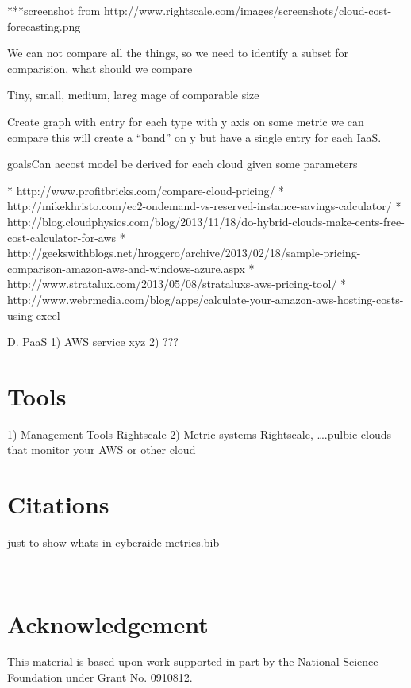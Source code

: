 \documentclass{sig-alternate}
\begin{document}
***screenshot from http://www.rightscale.com/images/screenshots/cloud-cost-forecasting.png

We can not compare all the things, so we need to identify a subset for comparision, what should we compare

Tiny, small, medium, lareg mage of comparable size

Create graph with entry for each type with y axis on some metric we can compare this will create a “band” on y but have a single entry for each IaaS. 

goalsCan accost model be derived for each cloud given some parameters



*	http://www.profitbricks.com/compare-cloud-pricing/
*	http://mikekhristo.com/ec2-ondemand-vs-reserved-instance-savings-calculator/
*	http://blog.cloudphysics.com/blog/2013/11/18/do-hybrid-clouds-make-cents-free-cost-calculator-for-aws
*	http://geekswithblogs.net/hroggero/archive/2013/02/18/sample-pricing-comparison-amazon-aws-and-windows-azure.aspx
*	http://www.stratalux.com/2013/05/08/strataluxs-aws-pricing-tool/
*	http://www.webrmedia.com/blog/apps/calculate-your-amazon-aws-hosting-costs-using-excel

D.	PaaS
1)	AWS service xyz
2)	???




\section{Tools}

1)	Management Tools
Rightscale
2)	Metric systems
Rightscale, 
….pulbic clouds that monitor your AWS or other cloud


\section{Citations}

just to show whats in cyberaide-metrics.bib

\cite{www-c,www-b,www-a,www-abc,www-salsa-class,www-amzon-calculator2,www-o,www-n,www-m,www-l,www-k,www-j,www-i,www-h,www-g,www-f,www-w,www-v,www-u,www-t,www-s,www-r,www-q,www-p,www-e,www-d,www-amzon-calculator-1,www-amzon-calculator-2}
 

 
  
\section*{Acknowledgement} 
 
This material is based upon work supported in part by the National Science Foundation under Grant No. 0910812.

 
 
 
% 


 
\end{document}
